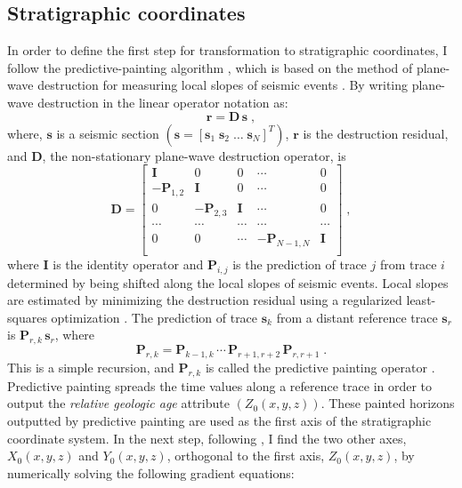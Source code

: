 \subsection{Stratigraphic coordinates}

In order to define the first step for transformation to stratigraphic coordinates, I follow the predictive-painting algorithm \cite[]{sergeyfomel2010}, which is based on the method of plane-wave destruction for measuring local slopes of seismic events \cite[]{claerbout1992,  sergeyfomel2002}. 
By writing plane-wave destruction in the linear operator notation as:
\begin{equation}
\label{eq:pw destruction operation}
 \mathbf{r} = \mathbf{D\,s}\;,
\end{equation}
where, $\mathbf{s}$ is a seismic section $\left(\mathbf{s} =\left[\mathbf{s}_1 \; \mathbf{s}_2 \; \ldots \;\mathbf{s}_N\right]^T\right)$, $\mathbf{r}$ is the destruction residual, and $\mathbf{D}$, the non-stationary plane-wave destruction operator, is
\begin{equation}
 \label{eq:destruction operator}
 \mathbf{D} = 
 \left[\begin{array}{ccccc}
     \mathbf{I} & 0 & 0 & \cdots & 0 \\
      - \mathbf{P}_{1,2} & \mathbf{I} & 0 & \cdots & 0 \\
      0 & - \mathbf{P}_{2,3} & \mathbf{I} & \cdots & 0 \\
      \cdots & \cdots & \cdots & \cdots & \cdots \\
      0 & 0 & \cdots & - \mathbf{P}_{N-1,N} & \mathbf{I} \\
    \end{array}\right]\;,
\end{equation}
where $\mathbf{I}$ is the identity operator and $\mathbf{P}_{i,j}$ is the prediction of trace $j$ from trace $i$ determined by %
 being shifted along the local slopes of seismic events. Local slopes are estimated by minimizing the destruction residual using a regularized least-squares optimization%
. The prediction of trace $\mathbf{s}_k$ from a distant reference trace $\mathbf{s}_r$ is $\mathbf{P}_{r,k}\,\mathbf{s}_r$, where
\begin{equation}
\label{eq:predictive}
\mathbf{P}_{r,k} = \mathbf{P}_{k-1,k}\,  \cdots\,  \mathbf{P}_{r+1,r+2}\,  \mathbf{P}_{r,r+1}\;.
\end{equation}
This is a simple recursion, and $\mathbf{P}_{r,k}$ is called the predictive painting operator \cite[]{sergeyfomel2010}. Predictive painting spreads the time values along a reference trace in order to output the \emph{relative geologic age} attribute $\left(Z_0(x,y,z)\right)$. These painted horizons outputted by predictive painting are used as the first axis of the stratigraphic coordinate system. In the next step, following \cite{karimi2011,karimi2014}, I find the two other axes, $X_0\left(x,y,z\right)$ and $Y_0\left(x,y,z\right)$, orthogonal to the first axis, $Z_0\left(x,y,z\right)$, by numerically solving the following gradient equations:
